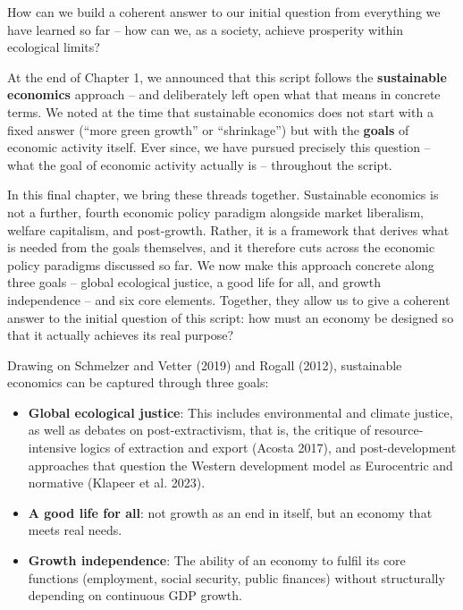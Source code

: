 \documentclass[
  british,
  a4paper,
  DIV=11,
  numbers=noendperiod,
  oneside,
  openany]{scrreprt}
\begin{document}
\begin{tcolorbox}[enhanced jigsaw, arc=.35mm, bottomrule=.15mm, bottomtitle=1mm, breakable, colback=white, colbacktitle=quarto-callout-note-color!10!white, colframe=quarto-callout-note-color-frame, coltitle=black, left=2mm, leftrule=.75mm, opacityback=0, opacitybacktitle=0.6, rightrule=.15mm, title={Guiding question}, titlerule=0mm, toprule=.15mm, toptitle=1mm]

How can we build a coherent answer to our initial question from
everything we have learned so far -- how can we, as a society, achieve
prosperity within ecological limits?

\end{tcolorbox}

At the end of Chapter 1, we announced that this script follows the
\textbf{sustainable economics} approach -- and deliberately left open
what that means in concrete terms. We noted at the time that sustainable
economics does not start with a fixed answer (``more green growth'' or
``shrinkage'') but with the \textbf{goals} of economic activity itself.
Ever since, we have pursued precisely this question -- what the goal of
economic activity actually is -- throughout the script.

In this final chapter, we bring these threads together. Sustainable
economics is not a further, fourth economic policy paradigm alongside
market liberalism, welfare capitalism, and post-growth. Rather, it is a
framework that derives what is needed from the goals themselves, and it
therefore cuts across the economic policy paradigms discussed so far. We
now make this approach concrete along three goals -- global ecological
justice, a good life for all, and growth independence -- and six core
elements. Together, they allow us to give a coherent answer to the
initial question of this script: how must an economy be designed so that
it actually achieves its real purpose?

Drawing on Schmelzer and Vetter (2019) and Rogall (2012), sustainable
economics can be captured through three goals:

\begin{itemize}
\item
  \textbf{Global ecological justice}: This includes environmental and
  climate justice, as well as debates on post-extractivism, that is, the
  critique of resource-intensive logics of extraction and export (Acosta
  2017), and post-development approaches that question the Western
  development model as Eurocentric and normative (Klapeer et al. 2023).
\item
  \textbf{A good life for all}: not growth as an end in itself, but an
  economy that meets real needs.
\item
  \textbf{Growth independence}: The ability of an economy to fulfil its
  core functions (employment, social security, public finances) without
  structurally depending on continuous GDP growth.
\end{itemize}
\end{document}
